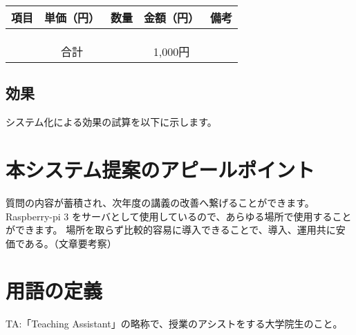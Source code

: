 \documentclass[a4j,titlepage]{ujarticle}
\begin{document}
\begin{table}[htb]
  \begin{tabular}{|c|c|c|c|c|} \hline
    項目 & 単価（円） & 数量 & 金額（円） & 備考 \\ \hline
     &  &  &  &  \\ \hline
     &  &  &  &  \\ \hline
     &  &  &  &  \\ \hline
    \multicolumn{3}{c||}{合計}& 1,000円 &  \\ \hline
  \end{tabular}
\end{table}


\subsection{効果}
システム化による効果の試算を以下に示します。

\section{本システム提案のアピールポイント}
質問の内容が蓄積され、次年度の講義の改善へ繋げることができます。
Raspberry-pi 3 をサーバとして使用しているので、あらゆる場所で使用することができます。
場所を取らず比較的容易に導入できることで、導入、運用共に安価である。（文章要考察）

\section{用語の定義}
TA:「Teaching Assistant」の略称で、授業のアシストをする大学院生のこと。





\newpage
\end{document}
